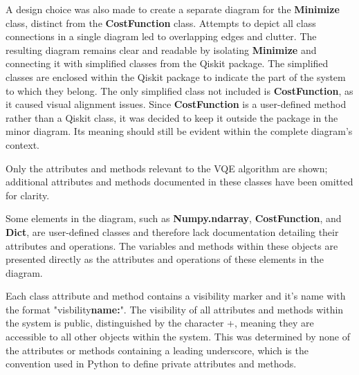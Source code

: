\documentclass{article}
\begin{document}
{A design choice was also made to create a separate diagram for the \textbf{Minimize} class, distinct from the \textbf{CostFunction} class. Attempts to depict all class connections in a single diagram led to overlapping edges and clutter. The resulting diagram remains clear and readable by isolating \textbf{Minimize} and connecting it with simplified classes from the Qiskit package. The simplified classes are enclosed within the Qiskit package to indicate the part of the system to which they belong. The only simplified class not included is \textbf{CostFunction}, as it caused visual alignment issues. Since \textbf{CostFunction} is a user-defined method rather than a Qiskit class, it was decided to keep it outside the package in the minor diagram. Its meaning should still be evident within the complete diagram's context.

Only the attributes and methods relevant to the VQE algorithm are shown; additional attributes and methods documented in these classes have been omitted for clarity.

Some elements in the diagram, such as \textbf{Numpy.ndarray}, \textbf{CostFunction}, and \textbf{Dict}, are user-defined classes and therefore lack documentation detailing their attributes and operations. The variables and methods within these objects are presented directly as the attributes and operations of these elements in the diagram.

Each class attribute and method contains a visibility marker and it's name with the format "visbility\textbf{name:}". The visibility of all attributes and methods within the system is public, distinguished by the character +, meaning they are accessible to all other objects within the system\cite{Seidl_Scholz_Huemer_Kappel_Duffy_2014}. This was determined by none of the attributes or methods containing a leading underscore, which is the convention used in Python to define private attributes and methods\cite{Privacy}.

}
\end{document}
